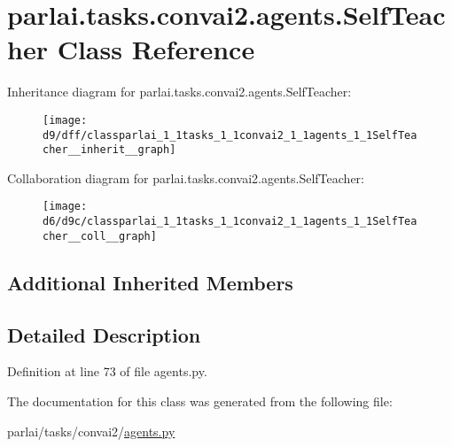 \hypertarget{classparlai_1_1tasks_1_1convai2_1_1agents_1_1SelfTeacher}{}\section{parlai.\+tasks.\+convai2.\+agents.\+Self\+Teacher Class Reference}
\label{classparlai_1_1tasks_1_1convai2_1_1agents_1_1SelfTeacher}


Inheritance diagram for parlai.\+tasks.\+convai2.\+agents.\+Self\+Teacher\+:
\nopagebreak
\begin{figure}[H]
\begin{center}
\leavevmode
\texttt{[image: d9/dff/classparlai\_1\_1tasks\_1\_1convai2\_1\_1agents\_1\_1SelfTeacher\_\_inherit\_\_graph]}
\end{center}
\end{figure}


Collaboration diagram for parlai.\+tasks.\+convai2.\+agents.\+Self\+Teacher\+:
\nopagebreak
\begin{figure}[H]
\begin{center}
\leavevmode
\texttt{[image: d6/d9c/classparlai\_1\_1tasks\_1\_1convai2\_1\_1agents\_1\_1SelfTeacher\_\_coll\_\_graph]}
\end{center}
\end{figure}
\subsection*{Additional Inherited Members}


\subsection{Detailed Description}


Definition at line 73 of file agents.\+py.



The documentation for this class was generated from the following file\+:\begin{DoxyCompactItemize}
\item 
parlai/tasks/convai2/\hyperlink{parlai_2tasks_2convai2_2agents_8py}{agents.\+py}\end{DoxyCompactItemize}
